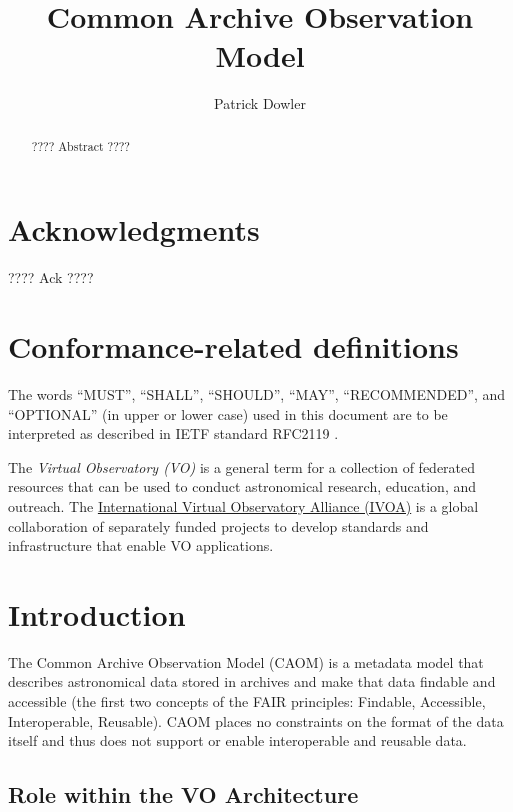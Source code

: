 \documentclass[11pt,a4paper]{ivoa}
\title{Common Archive Observation Model}
\author[https://wiki.ivoa.net/twiki/bin/view/IVOA/PatrickDowler]{Patrick Dowler}
\begin{document}
\begin{abstract}
???? Abstract ????
\end{abstract}


\section*{Acknowledgments}

???? Ack ????

\section*{Conformance-related definitions}

The words ``MUST'', ``SHALL'', ``SHOULD'', ``MAY'', ``RECOMMENDED'', and
``OPTIONAL'' (in upper or lower case) used in this document are to be
interpreted as described in IETF standard RFC2119 \citep{std:RFC2119}.

The \emph{Virtual Observatory (VO)} is a
general term for a collection of federated resources that can be used
to conduct astronomical research, education, and outreach.
The \href{https://www.ivoa.net}{International
Virtual Observatory Alliance (IVOA)} is a global
collaboration of separately funded projects to develop standards and
infrastructure that enable VO applications.


\section{Introduction}

The Common Archive Observation Model (CAOM) is a metadata model that describes
astronomical data stored in archives and make that data findable and accessible
(the first two concepts of the FAIR principles: Findable, Accessible, Interoperable,
Reusable). CAOM places no constraints on the format of the data itself and thus does 
not support or enable interoperable and reusable data.

\subsection{Role within the VO Architecture}
\end{document}
